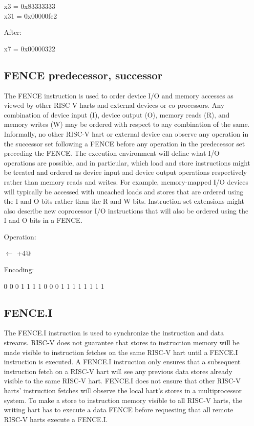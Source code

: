 x3  = 0x83333333\\
x31 = 0x00000fe2

After:

x7 = 0x00000322

\subsection{FENCE predecessor, successor}

The FENCE instruction is used to order device I/O and memory accesses as 
viewed by other RISC-V harts and external devices or co-processors. Any 
combination of device input (I), device output (O), memory reads (R), 
and memory writes (W) may be ordered with respect to any combination
of the same. Informally, no other RISC-V hart or external device can 
observe any operation in the successor set following a FENCE before any 
operation in the predecessor set preceding the FENCE. The execution 
environment will define what I/O operations are possible, and in particular, 
which load and store instructions might be treated and ordered as device 
input and device output operations respectively rather than memory reads 
and writes. For example, memory-mapped I/O devices will typically be 
accessed with uncached loads and stores that are ordered using the I and O
 bits rather than the R and W bits. Instruction-set extensions might 
also describe new coprocessor I/O instructions that will also be ordered 
using the I and O bits in a FENCE.~\cite[p.~21]{rvismv1v22:2017}

Operation:

\verb@pc@ $\leftarrow$ \verb@pc+4@

Encoding:

{0 0 0 1 1 1 1}		%
{0 0 0}				%
{1 1 1 1}			%
{1 1 1 1}			%

\subsection{FENCE.I}

The FENCE.I instruction is used to synchronize the instruction and 
data streams. RISC-V does not guarantee that stores to instruction 
memory will be made visible to instruction fetches on the same
RISC-V hart until a FENCE.I instruction is executed. A FENCE.I 
instruction only ensures that a subsequent instruction fetch on 
a RISC-V hart will see any previous data stores already visible to 
the same RISC-V hart. FENCE.I does not ensure that other RISC-V harts' 
instruction fetches will observe the local hart's stores in a 
multiprocessor system. To make a store to instruction memory
visible to all RISC-V harts, the writing hart has to execute a 
data FENCE before requesting that all remote RISC-V harts execute 
a FENCE.I.~\cite[p.~21]{rvismv1v22:2017}

